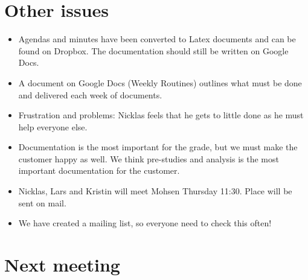 \documentclass[a4paper,12pt]{article}
\begin{document}
\section{Other issues}
\begin{itemize}
\item
Agendas and minutes have been converted to Latex documents and can be found on Dropbox. The documentation should still be written on Google Docs.
\item
A document on Google Docs (Weekly Routines) outlines what must be done and delivered each week of documents.
\item
Frustration and problems: Nicklas feels that he gets to little done as he must help everyone else.
\item
Documentation is the most important for the grade, but we must make the customer happy as well. We think
pre-studies and analysis is the most important documentation for the customer.
\item
Nicklas, Lars and Kristin will meet Mohsen Thursday 11:30. Place will be sent on mail.
\item
We have created a mailing list, so everyone need to check this often!
\end{itemize}
\section{Next meeting}
\end{document}
